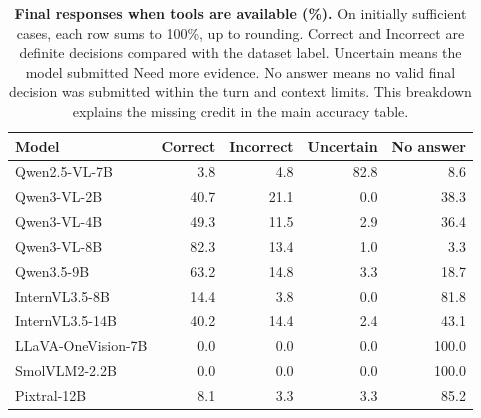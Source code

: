 \begin{table}[t]
\centering\small
\begin{minipage}{.88\textwidth}\centering
\caption{\textbf{Final responses when tools are available (\%).}
On initially sufficient cases, each row sums to 100\%, up to rounding. Correct and Incorrect are definite decisions compared with the dataset label.
Uncertain means the model submitted Need more evidence.
No answer means no valid final decision was submitted within the turn and context limits.
This breakdown explains the missing credit in the main accuracy table.}
\label{tab:agent-responses}
\begin{tabular}{@{}lrrrr@{}}
\toprule
Model & Correct & Incorrect & Uncertain & No answer\\
\midrule
Qwen2.5-VL-7B & 3.8 & 4.8 & 82.8 & 8.6\\
Qwen3-VL-2B & 40.7 & 21.1 & 0.0 & 38.3\\
Qwen3-VL-4B & 49.3 & 11.5 & 2.9 & 36.4\\
Qwen3-VL-8B & 82.3 & 13.4 & 1.0 & 3.3\\
Qwen3.5-9B & 63.2 & 14.8 & 3.3 & 18.7\\
InternVL3.5-8B & 14.4 & 3.8 & 0.0 & 81.8\\
InternVL3.5-14B & 40.2 & 14.4 & 2.4 & 43.1\\
LLaVA-OneVision-7B & 0.0 & 0.0 & 0.0 & 100.0\\
SmolVLM2-2.2B & 0.0 & 0.0 & 0.0 & 100.0\\
Pixtral-12B & 8.1 & 3.3 & 3.3 & 85.2\\
\bottomrule
\end{tabular}
\end{minipage}
\end{table}
